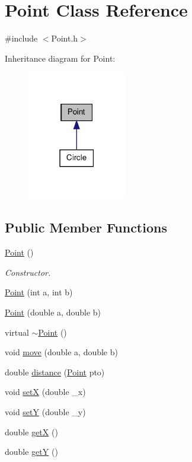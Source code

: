 \hypertarget{class_point}{
\section{Point Class Reference}
\label{class_point}
}


{\ttfamily \#include $<$Point.h$>$}



Inheritance diagram for Point:\nopagebreak
\begin{figure}[H]
\begin{center}
\leavevmode
\includegraphics[width=122pt]{class_point__inherit__graph}
\end{center}
\end{figure}
\subsection*{Public Member Functions}
\begin{DoxyCompactItemize}
\item 
\hyperlink{class_point_ad92f2337b839a94ce97dcdb439b4325a}{Point} ()
\begin{DoxyCompactList}\small\item\em Constructor. \item\end{DoxyCompactList}\item 
\hyperlink{class_point_a810fc4436b6631341363abfedbd6bb97}{Point} (int a, int b)
\item 
\hyperlink{class_point_aa56b1b397af1150bb784bdf1c362124d}{Point} (double a, double b)
\item 
virtual \hyperlink{class_point_a395fa04b4ec126b66fc053f829a30cc1}{$\sim$Point} ()
\item 
void \hyperlink{class_point_a2acbed03eb5b9c00f342703417d0ab89}{move} (double a, double b)
\item 
double \hyperlink{class_point_a3aaf9c8dd8b1a3f4b47656684454873e}{distance} (\hyperlink{class_point}{Point} pto)
\item 
void \hyperlink{class_point_a3c0726412ba563d5a632d23d3e7ff7b5}{setX} (double \_\-x)
\item 
void \hyperlink{class_point_a207ef070682cc8ad47833a5c99c2526a}{setY} (double \_\-y)
\item 
double \hyperlink{class_point_a8de35a6098cdd7267b4167776da83da6}{getX} ()
\item 
double \hyperlink{class_point_aa278c8bcb8aeb4101023a4baf473b547}{getY} ()
\end{DoxyCompactItemize}


